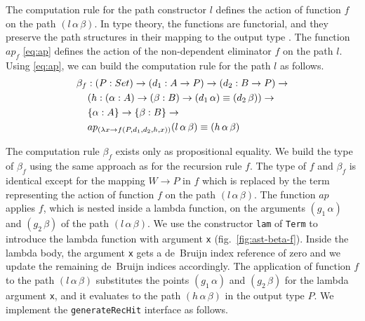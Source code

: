 \documentclass[sigplan,10pt]{acmart}
\begin{document}
The computation rule for the path constructor $l$ defines the action of function $f$ on the path $(l \, \alpha \, \beta)$. In type theory, the functions are functorial, and they preserve the path structures in their mapping to the output type \citep{HoTT-2013}. The function $ap_f$ \eqref{eq:ap} defines the action of the non-dependent eliminator $f$ on the path $l$. Using \eqref{eq:ap}, we can build the computation rule for the path $l$ as follows.
\begin{align}
& \beta_f : (P : Set) \rightarrow (d_1 : A \rightarrow P) \rightarrow (d_2 : B \rightarrow P) \rightarrow \nonumber \\
& \hspace {0.4cm} (h : (\alpha : A) \rightarrow (\beta : B) \rightarrow (d_1 \,  \alpha) \equiv (d_2 \, \beta)) \rightarrow \nonumber \\
& \hspace {0.4cm} \{\alpha : A\} \rightarrow \{\beta : B\} \rightarrow \nonumber \\
& \hspace {0.4cm} ap_{(\lambda x \rightarrow f(P, d_1, d_2, h, x))}(l \, \alpha \, \beta) \equiv (h \, \alpha \, \beta) \nonumber
\end{align}

The computation rule $\beta_f$ exists only as propositional equality. We build the type of $\beta_f$ using the same approach as for the recursion rule $f$. The type of $f$ and $\beta_f$ is identical except for the mapping $W \rightarrow P$ in $f$ which is replaced by the term representing the action of function $f$ on the path $(l \, \alpha \, \beta)$. The function $ap$ applies $f$, which is nested inside a lambda function, on the arguments $(g_1 \, \alpha)$ and $(g_2 \, \beta)$ of the path $(l \, \alpha \, \beta)$. We use the constructor {\tt lam} of {\tt Term} to introduce the lambda function with argument {\tt x} (fig.~\ref{fig:ast-beta-f}). Inside the lambda body, the argument {\tt x} gets a de~Bruijn index reference of zero and we update the remaining de~Bruijn indices accordingly. The application of function $f$ to the path $(l \, \alpha \, \beta)$ substitutes the points $(g_1 \, \alpha)$ and $(g_2 \, \beta)$ for the lambda argument {\tt x}, and it evaluates to the path $(h \, \alpha \, \beta)$ in the output type $P$. We implement the {\tt generateRecHit} interface as follows.
\end{document}
